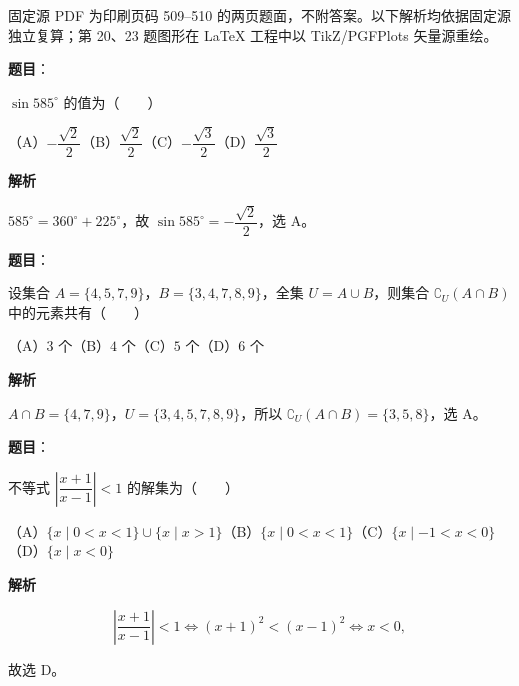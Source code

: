 

\begin{gktip}
固定源 PDF 为印刷页码 509–510 的两页题面，不附答案。以下解析均依据固定源独立复算；第 20、23 题图形在 LaTeX 工程中以 TikZ/PGFPlots 矢量源重绘。
\end{gktip}

\begin{answer}

\textbf{题目}：

$\sin585^\circ$ 的值为\mbox{（　　）}

（A）$-\dfrac{\sqrt2}{2}$\quad（B）$\dfrac{\sqrt2}{2}$\quad（C）$-\dfrac{\sqrt3}{2}$\quad（D）$\dfrac{\sqrt3}{2}$

\textbf{解析}

$585^\circ=360^\circ+225^\circ$，故 $\sin585^\circ=-\dfrac{\sqrt2}{2}$，选 A。


\end{answer}
\begin{answer}

\textbf{题目}：

设集合 $A=\{4,5,7,9\}$，$B=\{3,4,7,8,9\}$，全集 $U=A\cup B$，则集合 $\complement_U(A\cap B)$ 中的元素共有\mbox{（　　）}

（A）$3$ 个\quad（B）$4$ 个\quad（C）$5$ 个\quad（D）$6$ 个

\textbf{解析}

$A\cap B=\{4,7,9\}$，$U=\{3,4,5,7,8,9\}$，所以
$\complement_U(A\cap B)=\{3,5,8\}$，选 A。


\end{answer}
\begin{answer}

\textbf{题目}：

不等式 $\left|\dfrac{x+1}{x-1}\right|<1$ 的解集为\mbox{（　　）}

（A）$\{x\mid0<x<1\}\cup\{x\mid x>1\}$\quad（B）$\{x\mid0<x<1\}$\quad（C）$\{x\mid-1<x<0\}$\quad（D）$\{x\mid x<0\}$

\textbf{解析}

\nopagebreak[4]
\[
\left|\frac{x+1}{x-1}\right|<1
\Longleftrightarrow (x+1)^2<(x-1)^2
\Longleftrightarrow x<0,
\]

故选 D。


\end{answer}
